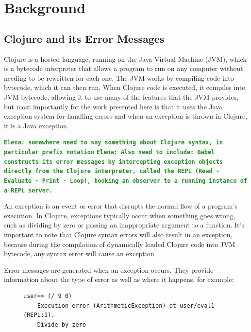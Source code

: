 \documentclass[12pt]{article}
\newcommand{\comment}[1]{{\bf \tt  {#1}}}
\newcommand{\emcomment}[1]{\textcolor{ForestGreen}{\comment{Elena: {#1}}}}
\newcommand{\tkcomment}[1]{\textcolor{Teal}{\comment{Tristan: {#1}}}}
\begin{document}
\section{Background}\label{sec:background}

\subsection{Clojure and its Error Messages}\label{subsec:clojure-errs}
	Clojure is a hosted language, running on the Java Virtual Machine (JVM), which is a bytecode interpreter that allows a program to run on any computer without needing to be rewritten for each one. 
	The JVM works by compiling code into bytecode, which it can then run. When Clojure code is executed, it compiles into JVM bytecode, allowing it to use many of the features that the JVM provides, 
	but most importantly for the work presented here is that it uses the Java exception system for handling errors and when an exception is thrown in Clojure, it is a Java exception.


\emcomment{somewhere need to say something about Clojure syntax, in particular prefix notation}
\emcomment{Also need to include:
Babel constructs its error messages by intercepting exception objects directly from the Clojure interpreter, called the REPL (Read - Evaluate - Print - Loop), hooking an observer to a running instance of a REPL server.}
    
   An exception is an event or error that disrupts the normal flow of a program's execution. In Clojure, exceptions typically occur when something goes wrong, such as dividing by 
   zero or passing an inappropriate argument to a function. It's important to note that Clojure syntax errors will also result in an exception, because during the compilation of dynamically loaded Clojure code into JVM bytecode, 
   any syntax error will 
cause an exception.

   Error messages are generated when an exception occurs. They provide information about
   the type of error as well as where it happens, for example:

	\begin{figure}[h]
		\centering
		\begin{lstlisting}[breaklines=true, basicstyle=\ttfamily]
	user=> (/ 9 0)
	Execution error (ArithmeticException) at user/eval1 (REPL:1).
	Divide by zero
		\end{lstlisting}
	\end{figure}
\end{document}
